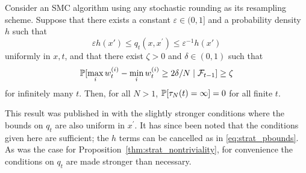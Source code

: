 \begin{prop}\label{thm:SR_nontriviality}
Consider an SMC algorithm using any stochastic rounding as its resampling scheme.
Suppose that there exists a constant $\varepsilon \in (0,1]$ and a probability density $h$ such that
\begin{equation*}
\varepsilon h(x') \leq q_t(x, x^\prime) \leq \varepsilon^{-1} h(x')
\end{equation*}
uniformly in $x,t$, and that there exist $\zeta >0$ and $\delta \in (0,1)$ such that 
\begin{equation*}
\mathbb{P}[ \max_i w_t^{(i)} - \min_i w_t^{(i)} \geq 2\delta/N \mid \mathcal{F}_{t-1} ] \geq \zeta
\end{equation*}
 for infinitely many $t$. Then, for all $N>1$, $\mathbb{P}[ \tau_N(t) = \infty ] =0$ for all finite $t$.
\end{prop}
This result was published in \textcite[Lemma B.1]{brown2021} with the slightly stronger conditions where the bounds on $q_t$ are also uniform in $x^\prime$. It has since been noted that the conditions given here are sufficient; the $h$ terms can be  cancelled as in \eqref{eq:strat_pbounds}.
As was the case for Proposition~\ref{thm:strat_nontriviality}, for convenience the conditions on $q_t$ are made stronger than necessary.

